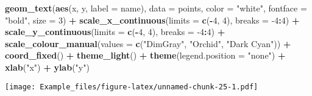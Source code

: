 \documentclass[]{article}
\newenvironment{Shaded}{\begin{snugshade}}{\end{snugshade}}
\newcommand{\DataTypeTok}[1]{\textcolor[rgb]{0.13,0.29,0.53}{#1}}
\newcommand{\DecValTok}[1]{\textcolor[rgb]{0.00,0.00,0.81}{#1}}
\newcommand{\KeywordTok}[1]{\textcolor[rgb]{0.13,0.29,0.53}{\textbf{#1}}}
\newcommand{\NormalTok}[1]{#1}
\newcommand{\OperatorTok}[1]{\textcolor[rgb]{0.81,0.36,0.00}{\textbf{#1}}}
\newcommand{\StringTok}[1]{\textcolor[rgb]{0.31,0.60,0.02}{#1}}
\begin{document}
\begin{Shaded}
\begin{Highlighting}[]
\StringTok{  }\KeywordTok{geom_text}\NormalTok{(}\KeywordTok{aes}\NormalTok{(x, y, }\DataTypeTok{label =}\NormalTok{ name), }\DataTypeTok{data =}\NormalTok{ points, }\DataTypeTok{color =} \StringTok{"white"}\NormalTok{, }\DataTypeTok{fontface =} \StringTok{"bold"}\NormalTok{, }\DataTypeTok{size =} \DecValTok{3}\NormalTok{) }\OperatorTok{+}
\StringTok{  }
\StringTok{   }\KeywordTok{scale_x_continuous}\NormalTok{(}\DataTypeTok{limits =} \KeywordTok{c}\NormalTok{(}\OperatorTok{-}\DecValTok{4}\NormalTok{, }\DecValTok{4}\NormalTok{), }\DataTypeTok{breaks =} \DecValTok{-4}\OperatorTok{:}\DecValTok{4}\NormalTok{) }\OperatorTok{+}
\StringTok{  }\KeywordTok{scale_y_continuous}\NormalTok{(}\DataTypeTok{limits =} \KeywordTok{c}\NormalTok{(}\OperatorTok{-}\DecValTok{4}\NormalTok{, }\DecValTok{4}\NormalTok{), }\DataTypeTok{breaks =} \DecValTok{-4}\OperatorTok{:}\DecValTok{4}\NormalTok{) }\OperatorTok{+}
\StringTok{  }\KeywordTok{scale_colour_manual}\NormalTok{(}\DataTypeTok{values =} \KeywordTok{c}\NormalTok{(}\StringTok{"DimGray"}\NormalTok{, }\StringTok{"Orchid"}\NormalTok{, }\StringTok{"Dark Cyan"}\NormalTok{)) }\OperatorTok{+}
\StringTok{  }\KeywordTok{coord_fixed}\NormalTok{() }\OperatorTok{+}
\StringTok{  }
\StringTok{  }\KeywordTok{theme_light}\NormalTok{() }\OperatorTok{+}
\StringTok{  }\KeywordTok{theme}\NormalTok{(}\DataTypeTok{legend.position =} \StringTok{"none"}\NormalTok{) }\OperatorTok{+}
\StringTok{  }\KeywordTok{xlab}\NormalTok{(}\StringTok{"x"}\NormalTok{) }\OperatorTok{+}
\StringTok{  }\KeywordTok{ylab}\NormalTok{(}\StringTok{"y"}\NormalTok{)}
\end{Highlighting}
\end{Shaded}

\texttt{[image: Example\_files/figure-latex/unnamed-chunk-25-1.pdf]}
\end{document}
